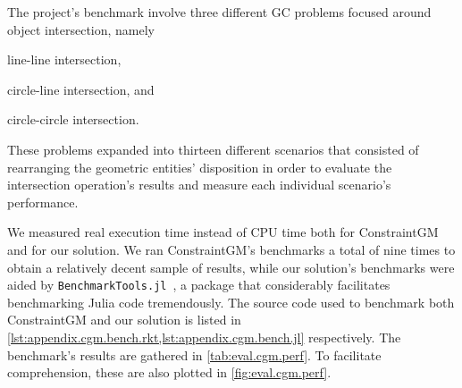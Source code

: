 The project's benchmark involve three different \ac{GC} problems focused around
object intersection, namely
\begin{enumerate*}[label= (\arabic*)]
  \item line-line intersection,
  \item circle-line intersection, and
  \item circle-circle intersection.
\end{enumerate*}
These problems expanded into thirteen different scenarios that consisted of
rearranging the geometric entities' disposition in order to evaluate the
intersection operation's results and measure each individual scenario's
performance.

We measured real execution time instead of \ac{CPU} time both for ConstraintGM
and for our solution.  We ran ConstraintGM's benchmarks a total of nine times to
obtain a relatively decent sample of results, while our solution's benchmarks
were aided by \texttt{BenchmarkTools.jl}~\cite{Chen:2016:BenchmarkTools.jl}, a
package that considerably facilitates benchmarking Julia code tremendously.  The
source code used to benchmark both ConstraintGM and our solution is listed in
\cref{lst:appendix.cgm.bench.rkt,lst:appendix.cgm.bench.jl} respectively.  The
benchmark's results are gathered in \cref{tab:eval.cgm.perf}.  To facilitate
comprehension, these are also plotted in \cref{fig:eval.cgm.perf}.

